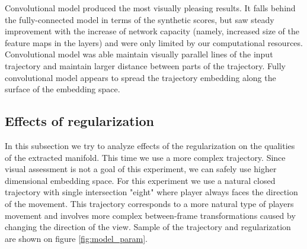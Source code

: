 Convolutional model produced the most visually pleasing results. It falls behind the fully-connected model in terms of the synthetic scores, but saw steady improvement with the increase of network capacity (namely, increased size of the feature maps in the layers) and were only limited by our computational resources. Convolutional model was able maintain visually parallel lines of the input trajectory and maintain larger distance between parts of the trajectory. Fully convolutional model appears to spread the trajectory embedding along the surface of the embedding space.

\subsection{Effects of regularization}

In this subsection we try to analyze effects of the regularization on the qualities of the extracted manifold. This time we use a more complex trajectory. Since visual assessment is not a goal of this experiment, we can safely use higher dimensional embedding space. For this experiment we use a natural closed trajectory with single intersection "eight" where player always faces the direction of the movement. This trajectory corresponds to a more natural type of players movement and involves more complex between-frame transformations caused by changing the direction of the view. Sample of the trajectory and regularization are shown on figure \ref{fig:model_param}.

